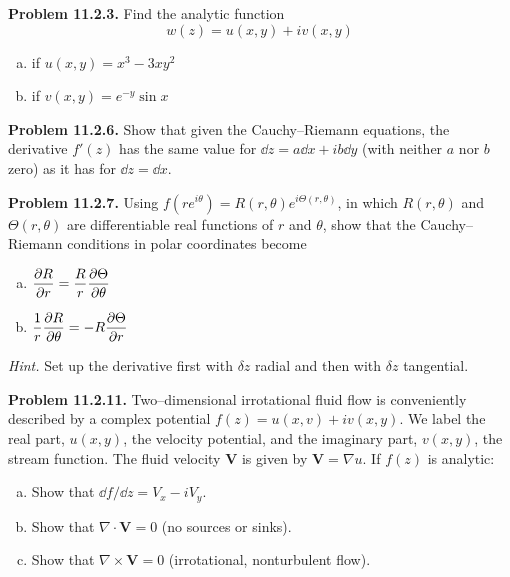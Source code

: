 \documentclass{article}
\begin{document}
\textbf{Problem 11.2.3.} Find the analytic function
\begin{equation*}
    w(z) = u(x,y) + iv(x,y)
\end{equation*}
\begin{enumerate}[(a)]
    \item if $u(x,y) = x^3-3xy^2$
    \item if $v(x,y) = e^{-y}\sin x$
\end{enumerate}

\hrulefill
 
\textbf{Problem 11.2.6.} Show that given the Cauchy--Riemann equations, the derivative $f'(z)$ has the same value for $\dd z = a\dd x + ib\dd y$ (with neither $a$ nor $b$ zero) as it has for $\dd z = \dd x$.

\vfill
\hrulefill

\textbf{Problem 11.2.7.} Using $f\left(re^{i\theta}\right) = R(r,\theta)e^{i\Theta(r,\theta)}$, in which $R(r,\theta)$ and $\Theta(r,\theta)$ are differentiable real functions of $r$ and $\theta$, show that the Cauchy--Riemann conditions in polar coordinates become
\begin{enumerate}[(a)]
    \item $\displaystyle{\pdv{R}{r} = \frac{R}{r}\pdv{\Theta}{\theta}}$
    \item $\displaystyle{\frac{1}{r}\pdv{R}{\theta} = -R\pdv{\Theta}{r}}$
\end{enumerate}
\textit{Hint.} Set up the derivative first with $\delta z$ radial and then with $\delta z$ tangential.

\vfill
\hrulefill

\textbf{Problem 11.2.11.} Two--dimensional irrotational fluid flow is conveniently described by a complex potential $f(z) = u(x,v) + iv(x,y)$. We label the real part, $u(x,y)$, the velocity potential, and the imaginary part, $v(x,y)$, the stream function. The fluid velocity $\mathbf{V}$ is given by $\mathbf{V} = \nabla u$. If $f(z)$ is analytic:

\begin{enumerate}[(a)]
    \item Show that $\dd f/\dd z = V_x - iV_y$.
    \item Show that $\nabla\cdot\mathbf{V} = 0$ (no sources or sinks).
    \item Show that $\nabla\times\mathbf{V} = 0$ (irrotational, nonturbulent flow).
\end{enumerate}
\end{document}
